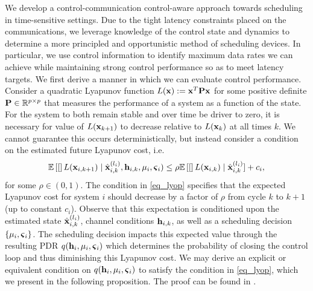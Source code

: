 We develop a control-communication control-aware approach towards scheduling in time-sensitive settings. Due to the tight latency constraints placed on the communications, we leverage knowledge of the control state and dynamics to determine a more principled and opportunistic method of scheduling devices. In particular, we use control information to identify maximum data rates we can achieve while maintaining strong control performance so as to meet latency targets. We first derive a manner in which we can evaluate control performance. Consider a quadratic Lyapunov function $L({\mathbf x}) := {\mathbf x}^T {\mathbf P} {\mathbf x}$ for some positive definite ${\mathbf P} \in {\mathbb R}^{p \times p}$ that measures the performance of a system as a function of the state. For the system to both remain stable and over time be driver to zero, it is necessary for value of $L({\mathbf x}_{k+1})$ to decrease relative to $L({\mathbf x}_k)$ at all times $k$. We cannot guarantee this occurs deterministically, but instead consider a condition on the estimated future Lyapunov cost, i.e.
%
\begin{align} \label{eq_lyop}
{\mathbb E}\left[[\right]L({\mathbf x}_{i,k+1}) \mid {\hat{\ensuremath{\mathbf x}} }^{(l_i)}_{i,k},{\mathbf h}_{i,k},\mu_i,\boldsymbol{\varsigma}_i) \leq \rho {\mathbb E}\left[[\right]L({\mathbf x}_{i,k}) \mid {\hat{\ensuremath{\mathbf x}} }^{(l_i)}_{i,k}] + c_i,
\end{align}
%
for some $\rho \in (0,1)$. The condition in \eqref{eq_lyop} specifies that the expected Lyapunov cost for system $i$ should decrease by a factor of $\rho$ from cycle $k$ to $k+1$ (up to constant $c_i$). Observe that this expectation is conditioned upon the estimated state ${\hat{\mathbf x} }^{(l_i)}_{i,k}$, channel conditions ${\mathbf h}_{i,k}$, as well as a scheduling decision $\{\mu_i, \boldsymbol{\varsigma}_i\}$. The scheduling decision impacts this expected value through the resulting PDR $q({\mathbf h}_i, \mu_i, \boldsymbol{\varsigma}_i)$ which determines the probability of closing the control loop and thus diminishing this Lyapunov cost. We may derive an explicit or equivalent condition on  $q({\mathbf h}_i, \mu_i, \boldsymbol{\varsigma}_i)$ to satisfy the condition in \eqref{eq_lyop}, which we present in the following proposition. The proof can be found in \cite{EisenEtal18}.

